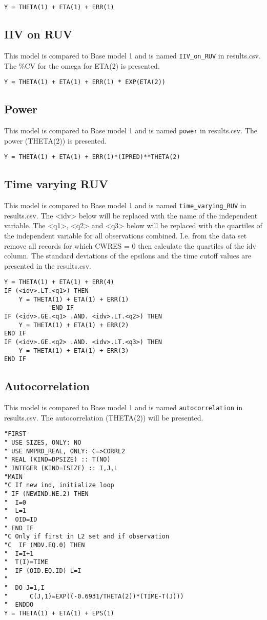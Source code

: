 \begin{verbatim}
Y = THETA(1) + ETA(1) + ERR(1)
\end{verbatim}

\subsection{IIV on RUV}
This model is compared to Base model 1 and is named \verb|IIV_on_RUV| in results.csv. The \%CV for the omega for ETA(2) is presented.

\begin{verbatim}
Y = THETA(1) + ETA(1) + ERR(1) * EXP(ETA(2))
\end{verbatim}

\subsection{Power}
This model is compared to Base model 1 and is named \verb|power| in results.csv. The power (THETA(2)) is presented.

\begin{verbatim}
Y = THETA(1) + ETA(1) + ERR(1)*(IPRED)**THETA(2)
\end{verbatim}

\subsection{Time varying RUV}
This model is compared to Base model 1 and is named \verb|time_varying_RUV| in results.csv. The <idv> below will be replaced with the name of the independent variable. The <q1>, <q2> and <q3> below will be replaced with the quartiles of the independent variable
for all observations combined. I.e. from the data set remove all records for which CWRES = 0 then calculate the quartiles of the idv column. The standard deviations of the epsilons and the time cutoff values are presented in the results.csv.
\begin{verbatim}
Y = THETA(1) + ETA(1) + ERR(4)
IF (<idv>.LT.<q1>) THEN
    Y = THETA(1) + ETA(1) + ERR(1)
            'END IF
IF (<idv>.GE.<q1> .AND. <idv>.LT.<q2>) THEN
    Y = THETA(1) + ETA(1) + ERR(2)
END IF
IF (<idv>.GE.<q2> .AND. <idv>.LT.<q3>) THEN
    Y = THETA(1) + ETA(1) + ERR(3)
END IF
\end{verbatim}

\subsection{Autocorrelation}
This model is compared to Base model 1 and is named \verb|autocorrelation| in results.csv. The autocorrelation (THETA(2)) will be presented.
\begin{verbatim}
"FIRST
" USE SIZES, ONLY: NO
" USE NMPRD_REAL, ONLY: C=>CORRL2
" REAL (KIND=DPSIZE) :: T(NO)
" INTEGER (KIND=ISIZE) :: I,J,L
"MAIN
"C If new ind, initialize loop
" IF (NEWIND.NE.2) THEN
"  I=0
"  L=1
"  OID=ID
" END IF
"C Only if first in L2 set and if observation
"C  IF (MDV.EQ.0) THEN
"  I=I+1
"  T(I)=TIME
"  IF (OID.EQ.ID) L=I
"
"  DO J=1,I
"      C(J,1)=EXP((-0.6931/THETA(2))*(TIME-T(J)))
"  ENDDO
Y = THETA(1) + ETA(1) + EPS(1)
\end{verbatim}


